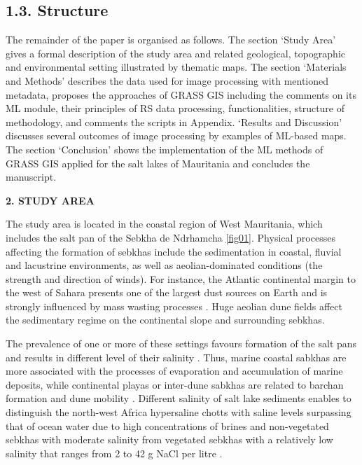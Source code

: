 \documentclass[12pt,a4paper,oneside]{article}
\def \newsection{\vspace{12pt}\textbf}
\def \newpar{\vspace{6pt}}
\begin{document}
\subsection*{1.3. Structure}

\newpar The remainder of the paper is organised as follows. The section ‘Study Area’ gives a formal description of the study area and related geological, topographic and environmental setting illustrated by thematic maps. The section ‘Materials and Methods’ describes the data used for image processing with mentioned metadata, proposes the approaches of GRASS GIS including the comments on its ML module, their principles of RS data processing, functionalities, structure of methodology, and comments the scripts in Appendix. ‘Results and Discussion’ discusses several outcomes of image processing by examples of ML-based maps. The section ‘Conclusion’ shows the implementation of the ML methods of GRASS GIS applied for the salt lakes of Mauritania and concludes the manuscript.

\newsection {2. STUDY AREA}

\newpar The study area is located in the coastal region of West Mauritania, which includes the salt pan of the Sebkha de Ndrhamcha \ref{fig01}. \newpar Physical processes affecting the formation of sebkhas include the sedimentation in coastal, fluvial and lacustrine environments, as well as aeolian-dominated conditions (the strength and direction of winds). For instance, the Atlantic continental margin to the west of Sahara presents one of the largest dust sources on Earth and is strongly influenced by mass wasting processes \citep{HENRICH2010178}. Huge aeolian dune fields affect the sedimentary regime on the continental slope and surrounding sebkhas.

\newpar The prevalence of one or more of these settings favours formation of the salt pans and results in different level of their salinity \citep{TARI2017331}. Thus, marine coastal sabkhas are more associated with the processes of evaporation and accumulation of marine deposits, while continental playas or inter-dune sabkhas are related to barchan formation and dune mobility \citep{HANDFORD1981255,Ould}. Different salinity of salt lake sediments enables to distinguish the north-west Africa hypersaline chotts with saline levels surpassing that of ocean water due to high concentrations of brines \citep{Lemenkova202313} and non-vegetated sebkhas with moderate salinity \citep{Lemenkova202322} from vegetated sebkhas with a relatively low salinity that ranges from 2 to 42 g NaCl per litre \citep{SOULIEMARSCHE200869}.
\end{document}
